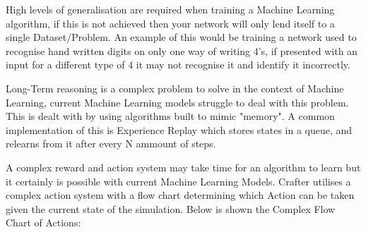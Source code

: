\begin{flushleft}
\begin{enumerate}
\begin{enumerate}
\begin{enumerate}
                            \vspace{0.2cm}

                            High levels of generalisation are required when training a Machine Learning algorithm, if this is not achieved then
                            your network will only lend itself to a single Dataset/Problem. An example of this would be training a network used
                            to recognise hand written digits on only one way of writing 4's, if presented with an input for a different type of 
                            4 it may not recognise it and identify it incorrectly. \\
                            
                            \vspace{0.2cm}

                            Long-Term reasoning is a complex problem to solve in the context of Machine Learning, current Machine Learning models
                            struggle to deal with this problem. This is dealt with by using algorithms built to mimic "memory". A common 
                            implementation of this is Experience Replay which stores states in a queue, and relearns from it after every N ammount
                            of steps. \\

                            \vspace{0.2cm}

                            A complex reward and action system may take time for an algorithm to learn but it certainly is possible with current
                            Machine Learning Models. Crafter utilises a complex action system with a flow chart determining which Action can be taken
                            given the current state of the simulation. Below is shown the Complex Flow Chart of Actions: \\


\end{enumerate}
\end{enumerate}
\end{enumerate}
\end{flushleft}
